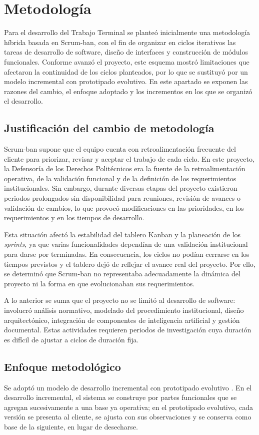 \section{Metodología}
\label{sec:metodologia}
Para el desarrollo del Trabajo Terminal se planteó inicialmente una metodología híbrida basada en Scrum-ban, con el fin de organizar en ciclos iterativos las tareas de desarrollo de software, diseño de interfaces y construcción de módulos funcionales. Conforme avanzó el proyecto, este esquema mostró limitaciones que afectaron la continuidad de los ciclos planteados, por lo que se sustituyó por un modelo incremental con prototipado evolutivo. En este apartado se exponen las razones del cambio, el enfoque adoptado y los incrementos en los que se organizó el desarrollo.

\subsection{Justificación del cambio de metodología}
Scrum-ban supone que el equipo cuenta con retroalimentación frecuente del cliente para priorizar, revisar y aceptar el trabajo de cada ciclo. En este proyecto, la Defensoría de los Derechos Politécnicos era la fuente de la retroalimentación operativa, de la validación funcional y de la definición de los requerimientos institucionales. Sin embargo, durante diversas etapas del proyecto existieron periodos prolongados sin disponibilidad para reuniones, revisión de avances o validación de cambios, lo que provocó modificaciones en las prioridades, en los requerimientos y en los tiempos de desarrollo.

Esta situación afectó la estabilidad del tablero Kanban y la planeación de los \textit{sprints}, ya que varias funcionalidades dependían de una validación institucional para darse por terminadas. En consecuencia, los ciclos no podían cerrarse en los tiempos previstos y el tablero dejó de reflejar el avance real del proyecto. Por ello, se determinó que Scrum-ban no representaba adecuadamente la dinámica del proyecto ni la forma en que evolucionaban sus requerimientos.

A lo anterior se suma que el proyecto no se limitó al desarrollo de software: involucró análisis normativo, modelado del procedimiento institucional, diseño arquitectónico, integración de componentes de inteligencia artificial y gestión documental. Estas actividades requieren periodos de investigación cuya duración es difícil de ajustar a ciclos de duración fija.

\subsection{Enfoque metodológico}
Se adoptó un modelo de desarrollo incremental con prototipado evolutivo \cite{pressman2014, sommerville2016}. En el desarrollo incremental, el sistema se construye por partes funcionales que se agregan sucesivamente a una base ya operativa; en el prototipado evolutivo, cada versión se presenta al cliente, se ajusta con sus observaciones y se conserva como base de la siguiente, en lugar de desecharse.

